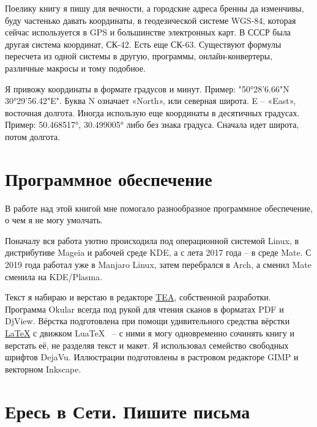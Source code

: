 Поелику книгу я пишу для вечности, а городские адреса бренны да изменчивы, буду частенько давать координаты, в геодезической системе WGS-84, которая сейчас используется в GPS и большинстве электронных карт. В СССР была другая система координат, СК-42. Есть еще СК-63. Существуют формулы пересчета из одной системы в другую, программы, онлайн-конвертеры, различные макросы и тому подобное. 

Я привожу координаты в формате градусов и минут. Пример: "50°28'6.66"N 30°29'56.42"E". Буква N означает «North», или северная широта. E – «East», восточная долгота. Иногда использую еще координаты в десятичных градусах. Пример: 50.468517°, 30.499005° либо без знака градуса. Сначала идет широта, потом долгота. 

\section*{Программное обеспечение} 

В работе над этой книгой мне помогало разнообразное программное обеспечение, о чем я не могу умолчать.

Поначалу вся работа уютно происходила под операционной системой Linux, в дистрибутиве Mageia и рабочей среде KDE, а с лета 2017 года – в среде Mate. С 2019 года работал уже в Manjaro Linux, затем перебрался в Arch, а сменил Mate сменила на KDE/Plasma. 

Текст я набираю и верстаю в редакторе \href{http://semiletov.org/tea}{TEA}, собственной разработки. Программа Okular всегда под рукой для чтения сканов в форматах PDF и DjView. Вёрстка подготовлена при помощи удивительного средства вёрстки \href{http://www.latex-project.org/}{\LaTeX} с движком Lua\TeX~ – с ними я могу одновременно сочинять книгу и верстать её, не разделяя текст и макет. Я использовал семейство свободных шрифтов DejaVu. Иллюстрации подготовлены в растровом редакторе GIMP и векторном Inkscape.




\section*{Ересь в Сети. Пишите письма}

